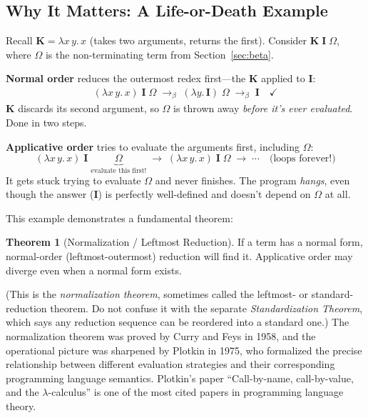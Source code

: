 \documentclass[11pt,a4paper]{article}
\theoremstyle{definition}
\newtheorem{theorem}[definition]{Theorem}
\newcommand{\lam}{\lambda}
\newcommand{\reduce}{\longrightarrow_\beta}
\begin{document}
\subsection{Why It Matters: A Life-or-Death Example}

\begin{workedexample}
Recall $\mathbf{K} = \lam x\, y.\, x$ (takes two arguments, returns the
first). Consider $\mathbf{K}\;\mathbf{I}\;\Omega$, where $\Omega$ is the
non-terminating term from Section~\ref{sec:beta}.

\textbf{Normal order} reduces the outermost redex first---the $\mathbf{K}$
applied to $\mathbf{I}$:
\begin{align*}
  (\lam x\, y.\, x)\;\mathbf{I}\;\Omega
  \;\reduce\; (\lam y.\, \mathbf{I})\;\Omega
  \;\reduce\; \mathbf{I} \quad\checkmark
\end{align*}
$\mathbf{K}$ discards its second argument, so $\Omega$ is thrown away
\emph{before it's ever evaluated}. Done in two steps.

\textbf{Applicative order} tries to evaluate the arguments first, including
$\Omega$:
\[
  (\lam x\, y.\, x)\;\mathbf{I}\;\underbrace{\Omega}_{\text{evaluate this first!}}
  \;\longrightarrow\; (\lam x\, y.\, x)\;\mathbf{I}\;\Omega
  \;\longrightarrow\; \cdots
  \quad\text{(loops forever!)}
\]
It gets stuck trying to evaluate $\Omega$ and never finishes. The program
\emph{hangs}, even though the answer ($\mathbf{I}$) is perfectly well-defined
and doesn't depend on $\Omega$ at all.
\end{workedexample}

This example demonstrates a fundamental theorem:

\begin{theorem}[Normalization / Leftmost Reduction]
If a term has a normal form, normal-order (leftmost-outermost) reduction will
find it. Applicative order may diverge even when a normal form exists.
\end{theorem}

(This is the \emph{normalization theorem}, sometimes called the leftmost- or
standard-reduction theorem. Do not confuse it with the separate
\emph{Standardization Theorem}, which says any reduction sequence can be
reordered into a standard one.) The normalization theorem was proved by Curry
and Feys in 1958, and the operational picture was sharpened
by Plotkin in 1975, who formalized the precise relationship between
different evaluation strategies and their corresponding programming language
semantics. Plotkin's paper ``Call-by-name, call-by-value, and the
$\lambda$-calculus'' is one of the most cited papers in programming language
theory.
\end{document}
